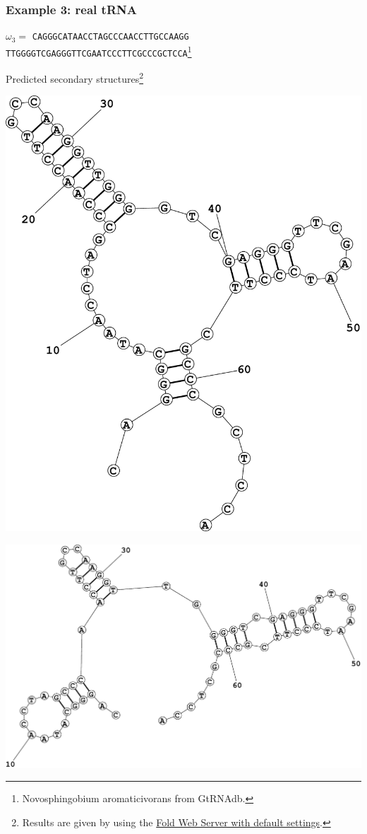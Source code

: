 \documentclass[xcolor=table]{beamer}
\begin{document}
\begin{frame}[fragile] \frametitle{Example 3: real tRNA}
\centering
 $\omega_3=$ \texttt{CAGGGCATAACCTAGCCCAACCTTGCCAAGG\\TTGGGGTCGAGGGTTCGAATCCCTTCGCCCGCTCCA}\footnote{\tiny{Novosphingobium aromaticivorans from GtRNAdb.}}
\vspace{0.5cm}

Predicted secondary structures\footnote{\tiny{Results are given by using the \href{http://rna.urmc.rochester.edu/RNAstructureWeb/Servers/Fold/Fold.html}{Fold Web Server with default settings}.}}

\begin{minipage}[t]{0.49\textwidth}
\centering
\includegraphics[width=.70\textwidth]{pictures/Fold1.pdf}
\end{minipage}
\begin{minipage}[t]{0.49\textwidth}
\centering
\includegraphics[width=.96\textwidth]{pictures/Fold2.pdf}
\end{minipage}

\end{frame}
\end{document}
